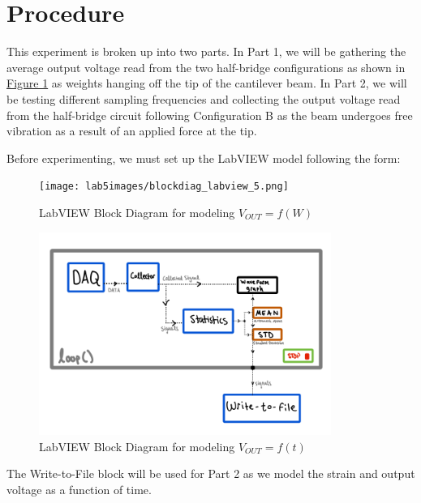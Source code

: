 \documentclass{article}
\begin{document}
\section{Procedure}
This experiment is broken up into two parts. In Part 1, we will be gathering the average output voltage read from the two half-bridge configurations as shown in \hyperlink{fig1}{Figure 1} as weights hanging off the tip of the cantilever beam. In Part 2, we will be testing different sampling frequencies and collecting the output voltage read from the half-bridge circuit following Configuration B as the beam undergoes free vibration as a result of an applied force at the tip. 
\vspace{2.5mm}

Before experimenting, we must set up the LabVIEW model following the form:

\begin{figure}[H]
    \centering
    \texttt{[image: lab5images/blockdiag\_labview\_5.png]}
    \caption{LabVIEW Block Diagram for modeling $V_{OUT}=f(W)$}
    \label{fig:labview_blockdiagram_5}
\end{figure}

\begin{figure}[H]
    \centering
    \includegraphics[width = 0.85\textwidth]{lab5images/labview_blockdiagram.png}
    \caption{LabVIEW Block Diagram for modeling $V_{OUT}=f(t)$}
    \label{fig:labview_blockdiagram}
\end{figure}

The Write-to-File block will be used for Part 2 as we model the strain and output voltage as a function of time.
\end{document}
